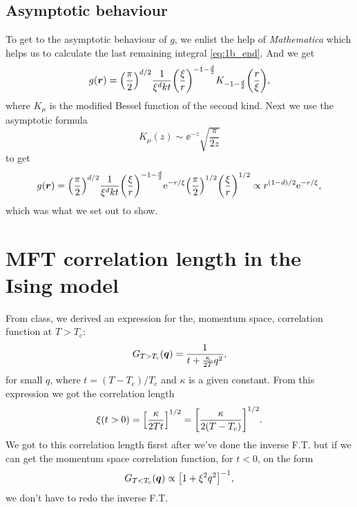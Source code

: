 \documentclass[11pt,letter, swedish, english
]{article}
\newcommand{\Tc}{\ensuremath{T_{\text{c}}}}
\begin{document}


\subsection{Asymptotic behaviour}
To get to the asymptotic behaviour of $g$, we enlist the help of
\textit{Mathematica} which helps us to calculate the last remaining
integral \eqref{eq:1b_end}. And we get
\begin{equation}
g(\vb*r)=\qty(\frac{\pi}{2})^{d/2}\frac{1}{\xi^dkt} 
\qty(\frac{\xi}{r})^{-1-\frac{d}{2}} 
K_{-1-\frac{d}{2}}\qty(\frac{r}{\xi}),
\end{equation}
where $K_\mu$ is the modified Bessel function of the second kind. Next
we use the asymptotic formula 
\begin{equation}
K_\mu(z)\sim \ee^{-z}\sqrt{\frac{\pi}{2z}}
\end{equation}
to get
\begin{equation}
g(\vb*r)=\qty(\frac{\pi}{2})^{d/2}\frac{1}{\xi^dkt} 
\qty(\frac{\xi}{r})^{-1-\frac{d}{2}} 
\mathrm{e}^{-r/\xi}\qty(\frac{\pi}{2})^{1/2}\qty(\frac{\xi}{r})^{1/2}
\propto
r^{(1-d)/2}\mathrm{e}^{-r/\xi},
\end{equation}
which was what we set out to show. 



\section{MFT correlation length in the Ising model}
From class, we derived an expression for the, momentum space,
correlation function at $T>\Tc$:
\begin{equation}
G_{T>\Tc}(\vb*q)=\frac{1}{t+\frac{\kappa}{2T}q^2},
\end{equation}
for small $q$, where $t=(T-\Tc)/\Tc$ and $\kappa$ is a given
constant. From this expression we got the correlation length
\begin{equation}
\xi(t>0)=\qty[\frac{\kappa}{2Tt}]^{1/2}
=\qty[\frac{\kappa}{2(T-\Tc)}]^{1/2}.
\end{equation}
We got to this correlation length fisrst after we've done
the inverse F.T. but if we can get the momentum space correlation
function, for $t<0$, on the form
\begin{equation}
G_{T<\Tc}(\vb*q)\propto\qty[1+\xi^2q^2]^{-1},
\end{equation}
we don't have to redo the inverse F.T.
\end{document}
